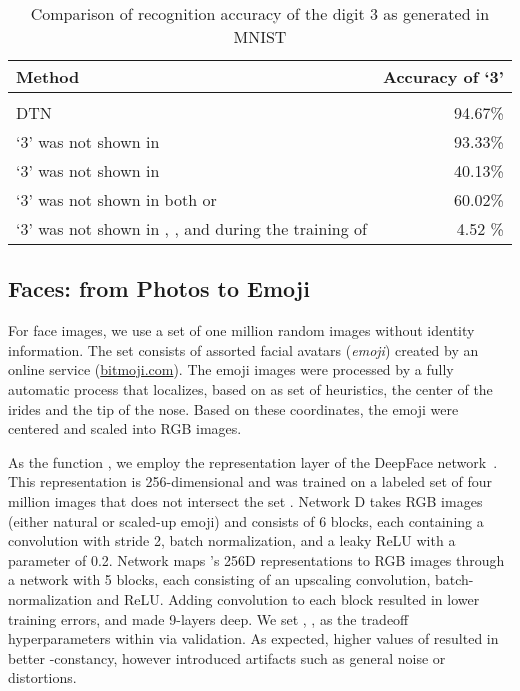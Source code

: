 \documentclass{article} \usepackage{iclr2017_conference,times}
\begin{document}
\begin{table}[t]
\caption{Comparison of recognition accuracy of the digit 3 as generated in MNIST}
\label{tab:compare3}
\begin{center}
\begin{tabular}{lr}
Method & Accuracy of `3'\\ \hline \\
DTN & 94.67\%   \\
`3' was not shown in             & 93.33\%  \\
`3' was not shown in              &  40.13\% \\
`3' was not shown in both  or      & 60.02\%   \\
`3' was not shown in , , and during the training of  & 4.52 \%  \\
\hline
\end{tabular}
\end{center}
\end{table}

\subsection{Faces: from Photos to Emoji}

For face images, we use a set  of one million random images without identity information. The set  consists of assorted facial avatars ({\it emoji}) created by an online service (\url{bitmoji.com}). The emoji images were processed by a fully automatic process that localizes, based on as set of heuristics, the center of the irides and the tip of the nose. Based on these coordinates, the emoji were centered and scaled into  RGB images.

As the function , we employ the representation layer of the DeepFace network~\cite{deepface}. This representation is 256-dimensional and was trained on a labeled set of four million images that does not intersect the set . Network D takes  RGB images (either natural or scaled-up emoji) and consists of 6 blocks, each containing a convolution with stride 2, batch normalization, and a leaky ReLU with a parameter of 0.2. Network  maps 's 256D representations to  RGB images through a network with 5 blocks, each consisting of an upscaling convolution, batch-normalization and ReLU. Adding  convolution to each block resulted in lower  training errors, and made  9-layers deep. We set , ,  as the tradeoff hyperparameters within  via validation. As expected, higher values of  resulted in better -constancy, however introduced artifacts such as general noise or distortions. 
\end{document}
